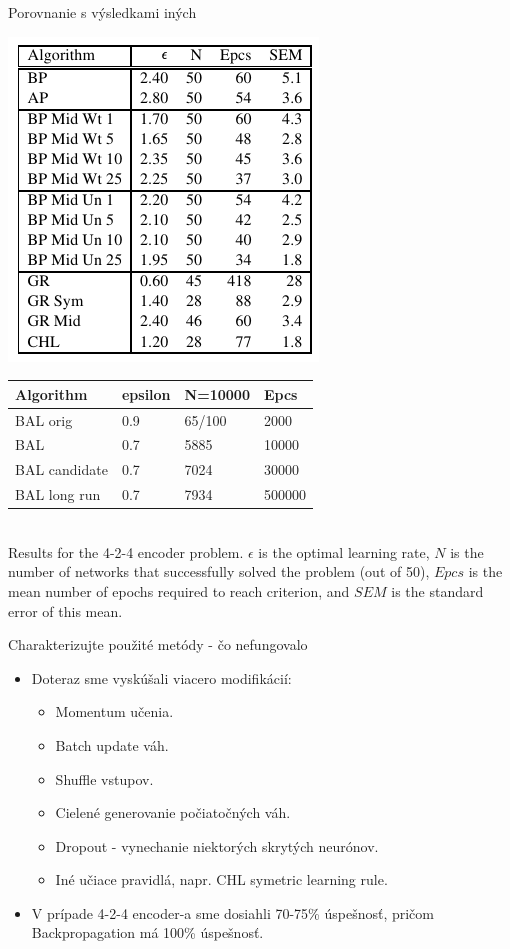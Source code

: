 \documentclass[xcolor=dvipsnames]{beamer}
\begin{document}
\begin{frame}{Porovnanie s výsledkami iných}
  \begin{center}
    \includegraphics[scale=0.5]{img/comparison.png} 
    \begin{tabular}{|l|l|l|l|}
      \hline
      Algorithm&epsilon&N=10000&Epcs\\
      \hline
      BAL orig &0.9&65/100&2000\\
      \hline
      BAL&0.7&5885&10000\\
      \hline
      BAL candidate&0.7&7024&30000\\
      \hline
      BAL long run&0.7&7934&500000\\
      \hline
    \end{tabular}\\

{\tiny Results for the 4-2-4 encoder problem. $\epsilon$ is the optimal learning rate, $N$ is the number of networks that successfully solved the problem (out of 50), $Epcs$ is the mean number of epochs required to reach criterion, and $SEM$ is the standard error of this mean.} 
  \end{center} 
\end{frame}

\begin{frame}{Charakterizujte použité metódy - čo nefungovalo}
  \begin{itemize}
    \item Doteraz sme vyskúšali viacero modifikácií: 
    \begin{itemize} 
      \item Momentum učenia.
      \item Batch update váh. 
      \item Shuffle vstupov. 
      \item Cielené generovanie počiatočných váh. 
      \item Dropout - vynechanie niektorých skrytých neurónov. 
      \item Iné učiace pravidlá, napr. CHL symetric learning rule.
    \end{itemize} 
    \item V prípade 4-2-4 encoder-a sme dosiahli 70-75\% úspešnosť, pričom Backpropagation má 100\% úspešnosť. 
  \end{itemize} 
\end{frame} 
\end{document}
